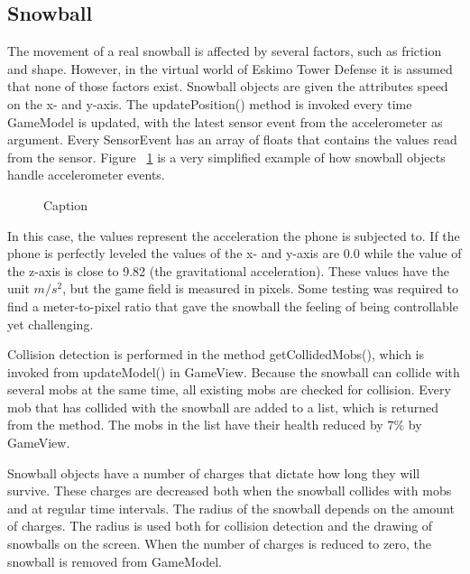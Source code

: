 \subsection{Snowball}

The movement of a real snowball is affected by several factors, such as friction and shape. However, in the virtual world of Eskimo Tower Defense it is assumed that none of those factors exist. Snowball objects are given the attributes speed on the x- and y-axis. The updatePosition() method is invoked every time GameModel is updated, with the latest sensor event from the accelerometer as argument. Every SensorEvent has an array of floats that contains the values read from the sensor. Figure ~\ref{fig:codeExUpdatePosition} is a very simplified example of how snowball objects handle accelerometer events.

\begin{figure}[htb]

\begin{small}

\end{small}

\caption{Caption}
\label{fig:codeExUpdatePosition}

\end{figure}

In this case, the values represent the acceleration the phone is subjected to. If the phone is perfectly leveled the values of the x- and y-axis are 0.0 while the value of the z-axis is close to 9.82 (the gravitational acceleration). These values have the unit \begin{math}m/s^2\end{math}, but the game field is measured in pixels. Some testing was required to find a meter-to-pixel ratio that gave the snowball the feeling of being controllable yet challenging.

Collision detection is performed in the method getCollidedMobs(), which is invoked from updateModel() in GameView. Because the snowball can collide with several mobs at the same time, all existing mobs are checked for collision. Every mob that has collided with the snowball are added to a list, which is returned from the method. The mobs in the list have their health reduced by \begin{math}7\%\end{math} by GameView.

Snowball objects have a number of charges that dictate how long they will survive. These charges are decreased both when the snowball collides with mobs and at regular time intervals. The radius of the snowball depends on the amount of charges. The radius is used both for collision detection and the drawing of snowballs on the screen. When the number of charges is reduced to zero, the snowball is removed from GameModel.
